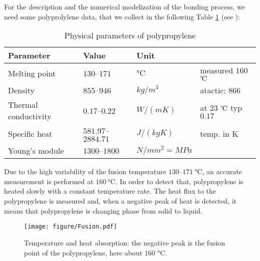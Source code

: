 For the description and the numerical modelization of the bonding process, we need some polyprolylene data, that we collect in the following Table \ref{tab:polipropilene} (see \cite{Passaglia, Maier, Young,Gianotti1968}):
\begin{table}[ht]
\centering
  \caption{Physical parameters of polypropylene}
   \label{tab:polipropilene}
  \begin{tabular}{llll}
    Parameter     & Value & Unit \\
    \hline
    Melting point        & $130$--$171$   & $\unit{\celsius}$        & measured $160$ $\celsius$ \\
    Density              & $855$--$946$   & $\unit{kg}/\unit{m}^3$   & atactic: $866$ \\
    Thermal conductivity & $0.17$--$0.22$  & $\unit{W}/(\unit{m K})$  &  at $23$ $\celsius$ typ $0.17$ \\
    Specific heat        & $581.97$--$2884.71$ & $\unit{J}/(\unit{kg K})$ & temp. in K \\
    Young's module         & $1300$--$1800$ & $\unit{N}/\unit{mm}^2=\unit{MPa}$               & \\
    \hline
  \end{tabular}
\end{table}
Due to the high variability of the fusion temperature $130$--$171 \ \unit{\celsius}$, an accurate measurement is performed at $160\ \unit{\celsius}$. In order to detect that, polypropylene is heated slowly with a constant temperature rate. The heat flux to the polypropylene is measured and, when a negative peak of heat is detected, it means that polypropylene is changing phase from solid to liquid.
\begin{figure}[H]
  \begin{center}
    \texttt{[image: figure/Fusion.pdf]}
  \end{center}
  \caption{Temperature and heat absorption: the negative peak is the fusion point of the polypropylene, here about $160$ $\unit{\celsius}$.}
  \label{fig:fusion}
\end{figure}

